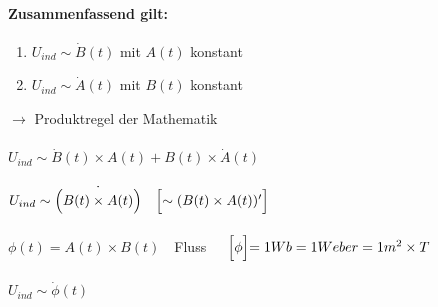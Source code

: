 \documentclass{report}
\begin{document}
		\paragraph{Zusammenfassend gilt:}
		
		\begin{enumerate}
			\item $U_{ind} \sim \dot B(t)$ mit $A(t)$ konstant
			\item $U_{ind} \sim \dot A(t)$ mit $B(t)$ konstant
		\end{enumerate}
		$\to$ Produktregel der Mathematik \\\\
		$U_{ind} \sim \dot B(t) \times A(t) + B(t) \times \dot A(t)$ \\\\
		$U_{ind} \sim \dot{\Bigl(B(t) \times A(t)\Bigl)}\ \ \ \Bigl[\sim (B(t) \times A(t))'\Bigl]$ \\\\
		$\phi(t) = A(t) \times B(t)$\ \ \dq Fluss\dq\ \ \ $\Bigl[\phi\Bigl] = 1Wb = 1 Weber = 1m^2 \times T$ \\
		\\ $U_{ind} \sim \dot \phi(t)$
\end{document}

